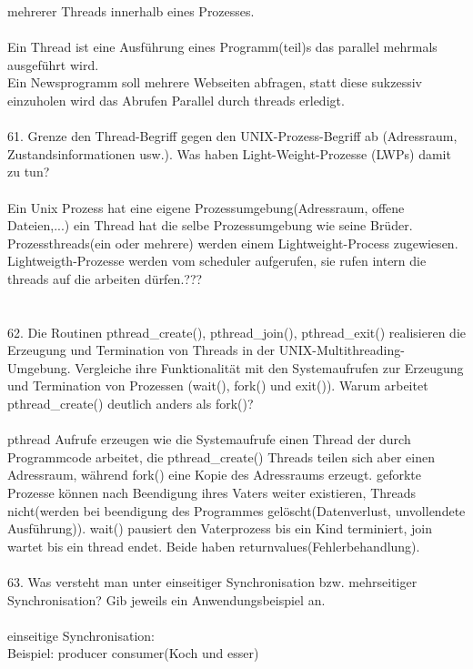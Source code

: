 \documentclass{article}
\newcommand\tab[1][1cm]{\hspace*{#1}}
\begin{document}
mehrerer Threads innerhalb eines Prozesses.
\\
\\
Ein Thread ist eine Ausf\"uhrung eines Programm(teil)s das parallel mehrmals ausgef\"uhrt wird.\\
Ein Newsprogramm soll mehrere Webseiten abfragen, statt diese sukzessiv einzuholen wird das Abrufen Parallel durch threads erledigt.
\\
\\
61. Grenze den Thread-Begriff gegen den UNIX-Prozess-Begriff ab (Adressraum, Zustandsinformationen usw.). Was haben Light-Weight-Prozesse (LWPs) damit zu tun?
\\
\\
Ein Unix Prozess hat eine eigene Prozessumgebung(Adressraum, offene Dateien,...) ein Thread hat die selbe Prozessumgebung wie seine Br\"uder.\\
Prozessthreads(ein oder mehrere) werden einem Lightweight-Process zugewiesen. Lightweigth-Prozesse werden vom scheduler aufgerufen, sie rufen intern die threads auf die arbeiten d\"urfen.???\\
\\
\\
62. Die Routinen pthread\_create(), pthread\_join(), pthread\_exit() realisieren die Erzeugung und Termination von Threads in der UNIX-Multithreading-Umgebung. Vergleiche
ihre Funktionalität mit den Systemaufrufen zur Erzeugung und Termination von Prozessen
(wait(), fork() und exit()). Warum arbeitet pthread\_create() deutlich anders als fork()?
\\
\\
pthread Aufrufe erzeugen wie die Systemaufrufe einen Thread der durch Programmcode arbeitet, die pthread\_create() Threads teilen sich aber einen Adressraum, w\"ahrend fork() eine Kopie des Adressraums erzeugt. 
geforkte Prozesse k\"onnen nach Beendigung ihres Vaters weiter existieren, Threads nicht(werden bei beendigung des Programmes gel\"oscht(Datenverlust, unvollendete Ausf\"uhrung)).
wait() pausiert den Vaterprozess bis ein Kind terminiert, join wartet bis ein thread endet. Beide haben returnvalues(Fehlerbehandlung).
\\
\\
63. Was versteht man unter einseitiger Synchronisation bzw. mehrseitiger Synchronisation?
Gib jeweils ein Anwendungsbeispiel an.
\\
\\
einseitige Synchronisation:\\
\tab Beispiel: producer consumer(Koch und esser)\\
\end{document}
